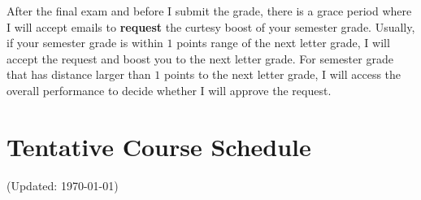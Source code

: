 \documentclass[12pt]{article}
\begin{document}
After the final exam and before I submit the grade, there is a grace period where I will accept emails to \textbf{request} the curtesy boost of your semester grade.
Usually, if your semester grade is within $ 1 $ points range of the next letter grade, I will accept the request and boost you to the next letter grade.
For semester grade that has distance larger than $ 1 $ points to the next letter grade, I will access the overall performance to decide whether I will approve the request.

\newpage







\section*{Tentative Course Schedule}

(Updated: \today)
\end{document}
